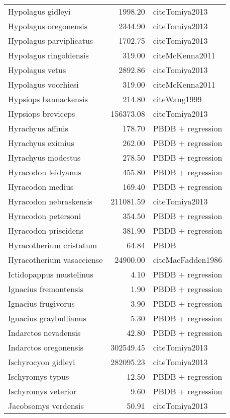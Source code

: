 \begin{table}[ht]
\begin{tabular}{lrl}
  Hypolagus gidleyi & 1998.20 & cite{Tomiya2013} \\ 
  Hypolagus oregonensis & 2344.90 & cite{Tomiya2013} \\ 
  Hypolagus parviplicatus & 1702.75 & cite{Tomiya2013} \\ 
  Hypolagus ringoldensis & 319.00 & cite{McKenna2011} \\ 
  Hypolagus vetus & 2892.86 & cite{Tomiya2013} \\ 
  Hypolagus voorhiesi & 319.00 & cite{McKenna2011} \\ 
  Hypsiops bannackensis & 214.80 & cite{Wang1999} \\ 
  Hypsiops breviceps & 156373.08 & cite{Tomiya2013} \\ 
  Hyrachyus affinis & 178.70 & PBDB + regression \\ 
  Hyrachyus eximius & 262.00 & PBDB + regression \\ 
  Hyrachyus modestus & 278.50 & PBDB + regression \\ 
  Hyracodon leidyanus & 455.80 & PBDB + regression \\ 
  Hyracodon medius & 169.40 & PBDB + regression \\ 
  Hyracodon nebraskensis & 211081.59 & cite{Tomiya2013} \\ 
  Hyracodon petersoni & 354.50 & PBDB + regression \\ 
  Hyracodon priscidens & 381.90 & PBDB + regression \\ 
  Hyracotherium cristatum & 64.84 & PBDB \\ 
  Hyracotherium vasacciense & 24900.00 & cite{MacFadden1986} \\ 
  Ictidopappus mustelinus & 4.10 & PBDB + regression \\ 
  Ignacius fremontensis & 1.90 & PBDB + regression \\ 
  Ignacius frugivorus & 3.90 & PBDB + regression \\ 
  Ignacius graybullianus & 5.30 & PBDB + regression \\ 
  Indarctos nevadensis & 42.80 & PBDB + regression \\ 
  Indarctos oregonensis & 302549.45 & cite{Tomiya2013} \\ 
  Ischyrocyon gidleyi & 282095.23 & cite{Tomiya2013} \\ 
  Ischyromys typus & 12.50 & PBDB + regression \\ 
  Ischyromys veterior & 9.60 & PBDB + regression \\ 
  Jacobsomys verdensis & 50.91 & cite{Tomiya2013} \\ 

\end{tabular}
\end{table}
